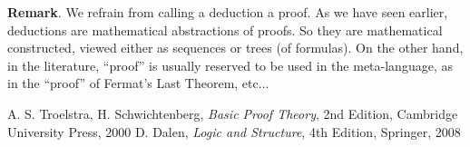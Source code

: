 \documentclass[12pt]{article}
\begin{document}
\textbf{Remark}.  We refrain from calling a deduction a proof.  As we have seen earlier, deductions are mathematical abstractions of proofs.  So they are mathematical constructed, viewed either as sequences or trees (of formulas).  On the other hand, in the literature, ``proof'' is usually reserved to be used in the meta-language, as in the ``proof'' of Fermat's Last Theorem, etc...

\begin{thebibliography}{0}
A. S. Troelstra, H. Schwichtenberg, 
{\it Basic Proof Theory}, 2nd Edition, Cambridge University Press, 2000
D. Dalen,
{\it Logic and Structure}, 4th Edition, Springer, 2008
\end{thebibliography}

\end{document}
